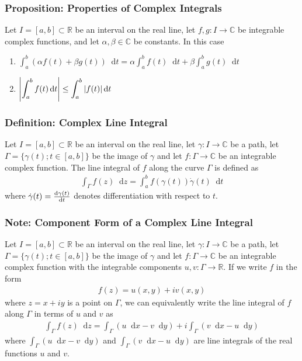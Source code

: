 \documentclass[11pt, a4paper]{article}
\newcommand{\diff}{\mathop{}\!\mathrm{d}} %
\newcommand{\R}{\mathbb{R}} %
\newcommand{\C}{\mathbb{C}} %
\begin{document}
\subsubsection{Proposition: Properties of Complex Integrals}
Let $ I = [a, b] \subset \R $ be an interval on the real line, let $ f, g:I \to \C $ be integrable complex functions, and let $ \alpha, \beta \in \C $ be constants. In this case
\begin{enumerate}
	\item $ \displaystyle{\int_{a}^{b}(\alpha f(t) + \beta g(t))\diff t = \alpha \int_{a}^{b} f(t) \diff t + \beta \int_{a}^{b} g(t) \diff t } $
	
	\item $ \displaystyle{\abs{\int_{a}^{b} f(t) \diff t } \leq \int_{a}^{b} \abs{f(t)} \diff t } $
\end{enumerate}

\subsubsection{Definition: Complex Line Integral}
Let $ I = [a, b] \subset \R $ be an interval on the real line, let $ \gamma: I \to \C $ be a path, let $ \Gamma = \{ \gamma(t) ; t \in [a, b] \} $ be the image of $ \gamma $ and let $ f: \Gamma \to \C $ be an integrable complex function. The line integral of $ f $ along the curve $ \Gamma $  is defined as
\begin{align*}
	\int_{\Gamma} f(z) \diff z = \int_{a}^{b}f(\gamma(t)) \dot{\gamma}(t) \diff t
\end{align*}
where $ \dot{\gamma}(t) = \dv{\gamma(t)}{t} $ denotes differentiation with respect to $ t $.

\subsubsection{Note: Component Form of a Complex Line Integral}
Let $ I = [a, b] \subset \R $ be an interval on the real line, let $ \gamma: I \to \C $ be a path, let $ \Gamma = \{ \gamma(t) ; t \in [a, b] \} $ be the image of $ \gamma $ and let $ f: \Gamma \to \C $ be an integrable complex function with the integrable components $ u, v : \Gamma \to \R $. If we write $ f $ in the form
\begin{align*}
	f(z) = u(x, y) + i v(x, y)
\end{align*}
where $ z = x + iy $ is a point on $ \Gamma $, we can equivalently write the line integral of $ f $ along $ \Gamma $ in terms of $ u $ and $ v $ as
\begin{align*}
	\int_{\Gamma} f(z) \diff z = \int_{\Gamma}(u \diff x - v \diff y) + i\int_{\Gamma}(v \diff x - u \diff y)
\end{align*}
where $  \int_{\Gamma}(u \diff x - v \diff y) $ and $ \int_{\Gamma}(v \diff x - u \diff y) $ are line integrals of the real functions $ u $ and $ v $.
\end{document}
